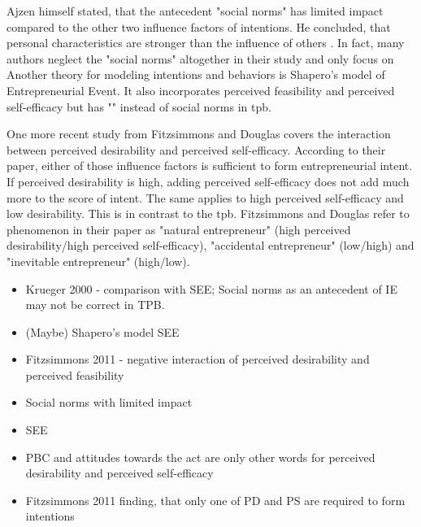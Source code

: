 Ajzen himself stated, that the antecedent "social norms" has limited impact compared to the other two influence factors of intentions. He concluded, that personal characteristics are stronger than the influence of others \cite{ajzen1991theory}. In fact, many authors neglect the "social norms" altogether in their study and only focus on \\

Another theory for modeling intentions and behaviors is Shapero's model of Entrepreneurial Event. It also incorporates perceived feasibility and perceived self-efficacy but has "" instead of social norms in \ac{tpb}.

One more recent study from Fitzsimmons and Douglas \cite{fitzsimmons2011interaction} covers the interaction between perceived desirability and perceived self-efficacy. According to their paper, either of those influence factors is sufficient to form entrepreneurial intent. If perceived desirability is high, adding perceived self-efficacy does not add much more to the score of intent. The same applies to high perceived self-efficacy and low desirability. This is in contrast to the \ac{tpb}. Fitzsimmons and Douglas refer to phenomenon in their paper as "natural entrepreneur" (high perceived desirability/high perceived self-efficacy), "accidental entrepreneur" (low/high) and "inevitable entrepreneur" (high/low).

\begin{itemize}
\item Krueger 2000 - comparison with SEE; Social norms as an antecedent of IE may not be correct in TPB.
\item (Maybe) Shapero's model SEE
\item Fitzsimmons 2011 - negative interaction of perceived desirability and perceived feasibility
\end{itemize}


\begin{itemize}
\item Social norms with limited impact
\item SEE
\item PBC and attitudes towards the act are only other words for perceived desirability and perceived self-efficacy
\item Fitzsimmons 2011 finding, that only one of PD and PS are required to form intentions 
\end{itemize}


